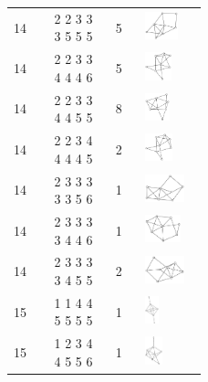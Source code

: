\begin{footnotesize}
\begin{longtable}{m{0.07\linewidth} m{0.15\linewidth} m{0.05\linewidth} m{0.15\linewidth}}
14 & 2 2 3 3 3 5 5 5 & 5 & \includegraphics[height=0.8cm]{15-universal-graphs/img/degree-sequences-example-graphs/graph-4-8-88}\\
14 & 2 2 3 3 4 4 4 6 & 5 & \includegraphics[height=0.8cm]{15-universal-graphs/img/degree-sequences-example-graphs/graph-4-8-89}\\
14 & 2 2 3 3 4 4 5 5 & 8 & \includegraphics[height=0.8cm]{15-universal-graphs/img/degree-sequences-example-graphs/graph-4-8-90}\\
14 & 2 2 3 4 4 4 4 5 & 2 & \includegraphics[height=0.8cm]{15-universal-graphs/img/degree-sequences-example-graphs/graph-4-8-91}\\
14 & 2 3 3 3 3 3 5 6 & 1 & \includegraphics[height=0.8cm]{15-universal-graphs/img/degree-sequences-example-graphs/graph-4-8-92}\\
14 & 2 3 3 3 3 4 4 6 & 1 & \includegraphics[height=0.8cm]{15-universal-graphs/img/degree-sequences-example-graphs/graph-4-8-93}\\
14 & 2 3 3 3 3 4 5 5 & 2 & \includegraphics[height=0.8cm]{15-universal-graphs/img/degree-sequences-example-graphs/graph-4-8-94}\\
15 & 1 1 4 4 5 5 5 5 & 1 & \includegraphics[height=0.8cm]{15-universal-graphs/img/degree-sequences-example-graphs/graph-4-8-95}\\
15 & 1 2 3 4 4 5 5 6 & 1 & \includegraphics[height=0.8cm]{15-universal-graphs/img/degree-sequences-example-graphs/graph-4-8-96}\\

\end{longtable}
\end{footnotesize}
